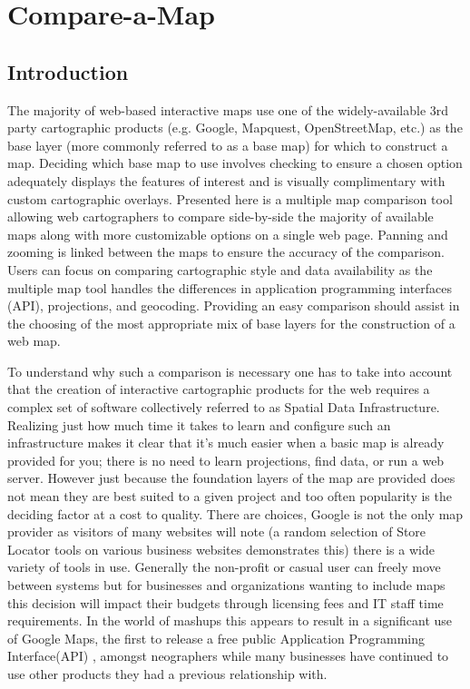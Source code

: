 \documentclass[12pt,letterpaper]{article}
\begin{document}
\section{Compare-a-Map}
\subsection{Introduction}
The majority of web-based interactive maps use one of the widely-available 3rd party cartographic products (e.g. Google, Mapquest, OpenStreetMap, etc.) as the base layer (more commonly referred to as a base map) for which to construct a map. Deciding which base map to use involves checking to ensure a chosen option adequately displays the features of interest and is visually complimentary with custom cartographic overlays.  Presented here is a multiple map comparison tool allowing web cartographers to compare side-by-side the majority of available maps along with more customizable options on a single web page. Panning and zooming is linked between the maps to ensure the accuracy of the comparison. Users can focus on comparing cartographic style and data availability as the multiple map tool handles the differences in application programming interfaces (API), projections, and geocoding.  Providing an easy comparison should assist in the choosing of the most appropriate mix of base layers for the construction of a web map.

	To understand why such a comparison is necessary one has to take into account that the creation of interactive cartographic products for the web requires a complex set of software collectively referred to as Spatial Data Infrastructure. Realizing just how much time it takes to learn and configure such an infrastructure makes it clear that it's much easier when a basic map is already provided for you; there is no need to learn projections, find data, or run a web server. However just because the foundation layers of the map are provided does not mean they are best suited to a given project and too often popularity is the deciding factor at a cost to quality. There are choices, Google is not the only map provider as visitors of many websites will note (a random selection of Store Locator tools on various business websites demonstrates this) there is a wide variety of tools in use. Generally the non-profit or casual user can freely move between systems but for businesses and organizations wanting to include maps this decision will impact their budgets through  licensing fees and IT staff time requirements. In the world of mashups this appears to result in a significant use of Google Maps, the first to release a free public Application Programming Interface(API) \parencite{Turner2006}, amongst neographers while many businesses have continued to use other products they had a previous relationship with.
	  
\end{document}
